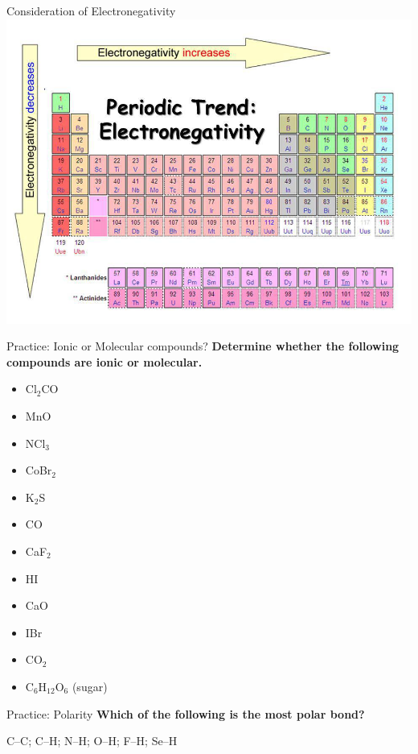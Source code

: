 \documentclass[11pt]{beamer}
\begin{document}
\begin{frame}{Consideration of Electronegativity}
  \centering
  \includegraphics[width=\linewidth]{electronegativity}
\end{frame}


\begin{frame}{Practice: Ionic or Molecular compounds?}
  \textbf{Determine whether the following compounds are ionic or molecular.}
  \begin{multicols}{2}
  \begin{itemize}
  \item Cl$_2$CO
  \item MnO
  \item NCl$_3$
  \item CoBr$_2$
  \item K$_2$S
  \item CO
  \item CaF$_2$
  \item HI
  \item CaO
  \item IBr
  \item CO$_2$
  \item C$_6$H$_{12}$O$_6$ (sugar)
  \end{itemize}
  \end{multicols}
\end{frame}

\begin{frame}{Practice: Polarity}
  \textbf{Which of the following is the most polar bond?}

    C--C; C--H; N--H; O--H; F--H; Se--H
\end{frame}
\end{document}
